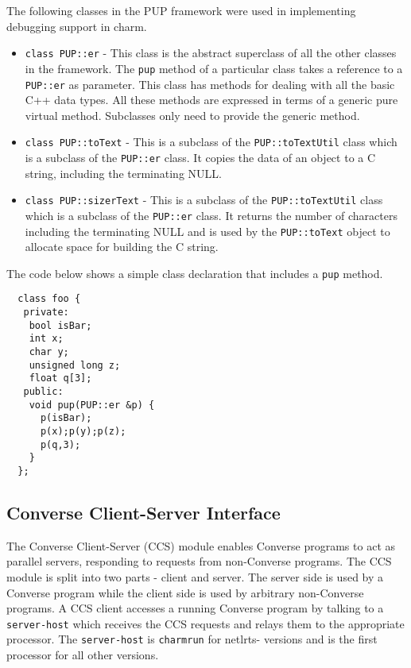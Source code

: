 
The following classes in the PUP framework were used in
implementing debugging support in charm.


\begin{itemize}

\item

\texttt{class PUP::er} - This class is the abstract superclass of
all the other classes in the framework. The \texttt{pup} method of
a particular class takes a reference to a \texttt{PUP::er} as
parameter. This class has methods for dealing with all the basic
C++ data types. All these methods are expressed in terms of a
generic pure virtual method. Subclasses only need to provide the
generic method.

\item

\texttt{class PUP::toText} - This is a subclass of the
\texttt{PUP::toTextUtil} class which is a subclass of the
\texttt{PUP::er} class. It copies the data of an object to a C
string, including the terminating NULL.

\item

\texttt{class PUP::sizerText} - This is a subclass of the
\texttt{PUP::toTextUtil} class which is a subclass of the
\texttt{PUP::er} class. It returns the number of characters
including the terminating NULL and is used by the
\texttt{PUP::toText} object to allocate space for building the C
string.

\end{itemize}


The code below shows a simple class declaration
that includes a \texttt{pup} method.


\begin{verbatim}
  class foo {
   private:
    bool isBar;
    int x;
    char y;
    unsigned long z;
    float q[3];
   public:
    void pup(PUP::er &p) {
      p(isBar);
      p(x);p(y);p(z);
      p(q,3);
    }
  };
\end{verbatim}


\subsection{Converse Client-Server Interface}

The Converse Client-Server (CCS) module enables Converse
\cite{InterOpIPPS96} programs to act as parallel servers,
responding to requests from non-Converse programs. The CCS module
is split into two parts - client and server. The server side is
used by a Converse program while the client side is used by
arbitrary non-Converse programs. A CCS client accesses a running
Converse program by talking to a \texttt{server-host} which
receives the CCS requests and relays them to the appropriate
processor. The \texttt{server-host} is \texttt{charmrun}
\cite{charmman} for netlrts- versions and is the first processor for
all other versions.

